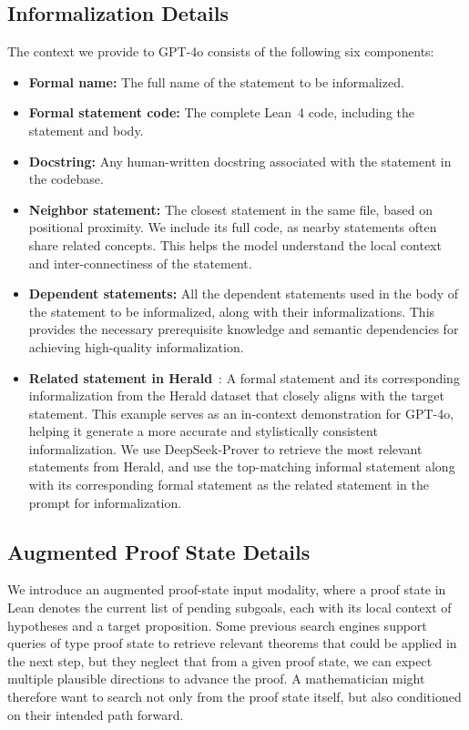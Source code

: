 \documentclass{article} %
\begin{document}
\subsection{Informalization Details}
\label{informalization_detail}
The context we provide to GPT-4o consists of the following six components:
\begin{itemize}[leftmargin=*]%
    \item \textbf{Formal name:} The full name of the statement to be informalized.
    \item \textbf{Formal statement code:} The complete Lean~4 code, including the statement and body.
    \item \textbf{Docstring:} Any human-written docstring associated with the statement in the codebase.
    \item \textbf{Neighbor statement:} The closest statement in the same file, based on positional proximity. We include its full code, as nearby statements often share related concepts. This helps the model understand the local context and inter-connectiness of the statement.
    \item \textbf{Dependent statements:} All the dependent statements used in the body of the statement to be informalized, along with their informalizations. This provides the necessary prerequisite knowledge and semantic dependencies for achieving high-quality informalization. 
    \item \textbf{Related statement in Herald}~\citep{gao2024herald}: A formal statement and its corresponding informalization from the Herald dataset that closely aligns with the target statement. This example serves as an in-context demonstration for GPT-4o, helping it generate a more accurate and stylistically consistent informalization. We use DeepSeek-Prover to retrieve the most relevant statements from Herald, and use the top-matching informal statement along with its
corresponding formal statement as the related statement in the prompt for informalization.
\end{itemize}


\subsection{Augmented Proof State Details}
\label{augmented_proof_state}

We introduce an augmented proof-state input modality, where a proof state in Lean denotes the current list of pending subgoals, each with its local context of hypotheses and a target proposition. Some previous search engines support queries of type proof state \citep{tao2025assisting, shen2025real, yang2023leandojo} to retrieve relevant theorems that could be applied in the next step, but they neglect that from a given proof state, we can expect multiple plausible directions to advance the proof. A mathematician might therefore want to search not only from the proof state itself, but also conditioned on their intended path forward. 
\end{document}
